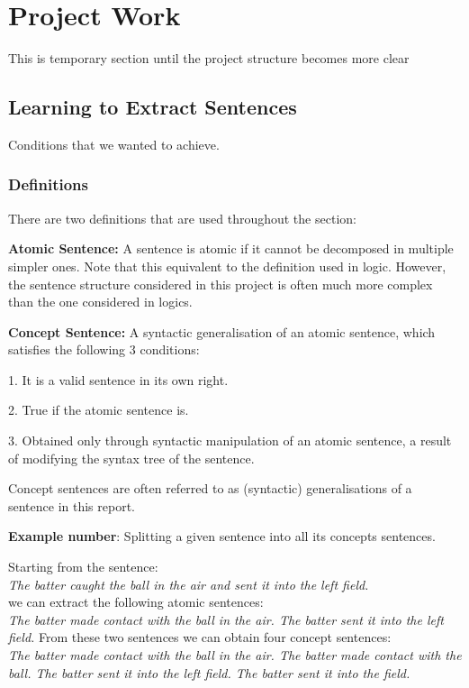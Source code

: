 


\chapter{Project Work}

This is temporary section until the project structure becomes more clear

\section{Learning to Extract Sentences}

Conditions that we wanted to achieve.

\subsection{Definitions}

There are two definitions that are used throughout the section:

\textbf{Atomic Sentence:} A sentence is atomic if it cannot be decomposed in multiple simpler ones. Note that this equivalent to the definition used in logic.
However, the sentence structure considered in this project is often much more complex than the one considered in logics.


\textbf{Concept Sentence:} A syntactic generalisation of an atomic sentence, which satisfies the following 3 conditions:

 1. It is a valid sentence in its own right.
 
 2. True if the atomic sentence is.
 
 3. Obtained only through syntactic manipulation of an atomic sentence, a result of modifying the syntax tree of the sentence.
 
Concept sentences are often referred to as (syntactic) generalisations of a sentence in this report.



\textbf{Example number}: Splitting a given sentence into all its concepts sentences. 

Starting from the sentence: \\
\textit{The batter caught the ball in the air and sent it into the left field.} \\
we can extract the following atomic sentences: \\
\textit{The batter made contact with the ball in the air. The batter sent it into the left field.}
From these two sentences we can obtain four concept sentences: \\
\textit{The batter made contact with the ball in the air. The batter made contact with the ball. The batter sent it into the left field. The batter sent it into the field.}


